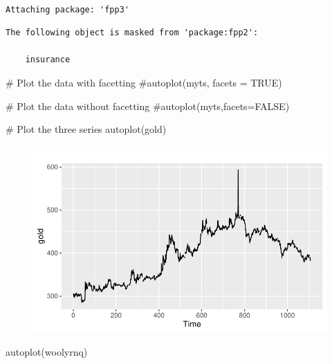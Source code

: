 \documentclass[
  letterpaper,
  DIV=11,
  numbers=noendperiod]{scrartcl}
\newenvironment{Shaded}{\begin{snugshade}}{\end{snugshade}}
\newcommand{\CommentTok}[1]{\textcolor[rgb]{0.37,0.37,0.37}{#1}}
\newcommand{\FunctionTok}[1]{\textcolor[rgb]{0.28,0.35,0.67}{#1}}
\newcommand{\NormalTok}[1]{\textcolor[rgb]{0.00,0.23,0.31}{#1}}
\begin{document}
\begin{verbatim}

Attaching package: 'fpp3'
\end{verbatim}

\begin{verbatim}
The following object is masked from 'package:fpp2':

    insurance
\end{verbatim}

\begin{Shaded}
\begin{Highlighting}[]
\CommentTok{\# Plot the data with facetting}
\CommentTok{\#autoplot(myts, facets = TRUE)}

\CommentTok{\# Plot the data without facetting}
\CommentTok{\#autoplot(myts,facets=FALSE)}

\CommentTok{\# Plot the three series}
\FunctionTok{autoplot}\NormalTok{(gold)}
\end{Highlighting}
\end{Shaded}

\begin{figure}[H]

{\centering \includegraphics{forecasting_datacamp_ex_files/figure-pdf/unnamed-chunk-2-1.pdf}

}

\end{figure}

\begin{Shaded}
\begin{Highlighting}[]
\FunctionTok{autoplot}\NormalTok{(woolyrnq)}
\end{Highlighting}
\end{Shaded}
\end{document}
